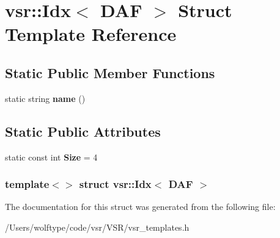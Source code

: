 \hypertarget{structvsr_1_1_idx_3_01_d_a_f_01_4}{\section{vsr\-:\-:Idx$<$ D\-A\-F $>$ Struct Template Reference}
\label{structvsr_1_1_idx_3_01_d_a_f_01_4}
}
\subsection*{Static Public Member Functions}
\begin{DoxyCompactItemize}
\item 
\hypertarget{structvsr_1_1_idx_3_01_d_a_f_01_4_ac5bb9c3b92ed1bf539ade3e41dfc17ed}{static string {\bfseries name} ()}\label{structvsr_1_1_idx_3_01_d_a_f_01_4_ac5bb9c3b92ed1bf539ade3e41dfc17ed}

\end{DoxyCompactItemize}
\subsection*{Static Public Attributes}
\begin{DoxyCompactItemize}
\item 
\hypertarget{structvsr_1_1_idx_3_01_d_a_f_01_4_a142830fdffc6db0f6dcc7519f1ab7a54}{static const int {\bfseries Size} = 4}\label{structvsr_1_1_idx_3_01_d_a_f_01_4_a142830fdffc6db0f6dcc7519f1ab7a54}

\end{DoxyCompactItemize}
\subsubsection*{template$<$$>$ struct vsr\-::\-Idx$<$ D\-A\-F $>$}



The documentation for this struct was generated from the following file\-:\begin{DoxyCompactItemize}
\item 
/\-Users/wolftype/code/vsr/\-V\-S\-R/vsr\-\_\-templates.\-h\end{DoxyCompactItemize}
